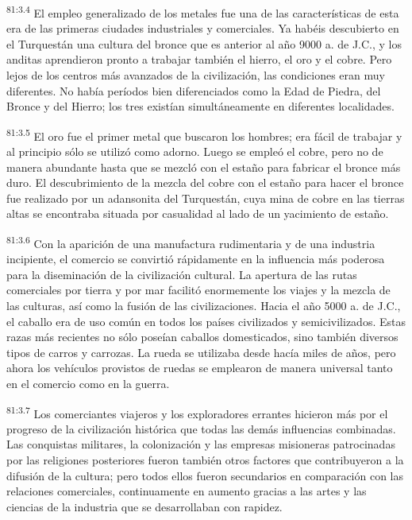 \documentclass[twoside, 11pt]{book}
\begin{document}
\par
\textsuperscript{81:3.4} El empleo generalizado de los metales fue una de las características de esta era de las primeras ciudades industriales y comerciales. Ya habéis descubierto en el Turquestán una cultura del bronce que es anterior al año 9000 a. de J.C., y los anditas aprendieron pronto a trabajar también el hierro, el oro y el cobre. Pero lejos de los centros más avanzados de la civilización, las condiciones eran muy diferentes. No había períodos bien diferenciados como la Edad de Piedra, del Bronce y del Hierro; los tres existían simultáneamente en diferentes localidades.

\par
\textsuperscript{81:3.5} El oro fue el primer metal que buscaron los hombres; era fácil de trabajar y al principio sólo se utilizó como adorno. Luego se empleó el cobre, pero no de manera abundante hasta que se mezcló con el estaño para fabricar el bronce más duro. El descubrimiento de la mezcla del cobre con el estaño para hacer el bronce fue realizado por un adansonita del Turquestán, cuya mina de cobre en las tierras altas se encontraba situada por casualidad al lado de un yacimiento de estaño.

\par
\textsuperscript{81:3.6} Con la aparición de una manufactura rudimentaria y de una industria incipiente, el comercio se convirtió rápidamente en la influencia más poderosa para la diseminación de la civilización cultural. La apertura de las rutas comerciales por tierra y por mar facilitó enormemente los viajes y la mezcla de las culturas, así como la fusión de las civilizaciones. Hacia el año 5000 a. de J.C., el caballo era de uso común en todos los países civilizados y semicivilizados. Estas razas más recientes no sólo poseían caballos domesticados, sino también diversos tipos de carros y carrozas. La rueda se utilizaba desde hacía miles de años, pero ahora los vehículos provistos de ruedas se emplearon de manera universal tanto en el comercio como en la guerra.

\par
\textsuperscript{81:3.7} Los comerciantes viajeros y los exploradores errantes hicieron más por el progreso de la civilización histórica que todas las demás influencias combinadas. Las conquistas militares, la colonización y las empresas misioneras patrocinadas por las religiones posteriores fueron también otros factores que contribuyeron a la difusión de la cultura; pero todos ellos fueron secundarios en comparación con las relaciones comerciales, continuamente en aumento gracias a las artes y las ciencias de la industria que se desarrollaban con rapidez.
\end{document}
